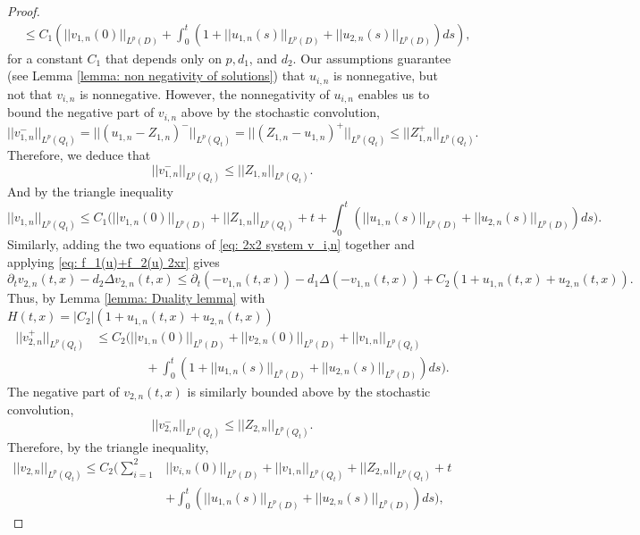 \documentclass[12pt]{article}
\theoremstyle{definition}
\theoremstyle{remark}
\begin{document}
\begin{proof}
\begin{align*}
&\leq C_1\left(||v_{1,n}(0)||_{L^p(D)}+ \int_0^t (1+||u_{1,n}(s)||_{L^p(D)}+||u_{2,n}(s)||_{L^p(D)})ds\right),
\end{align*}
for a constant $C_1$ that depends only on $p,d_1$, and $d_2$. Our assumptions guarantee (see Lemma \ref{lemma: non negativity of solutions}) that $u_{i,n}$ is nonnegative, but not that $v_{i,n}$ is nonnegative. However, the nonnegativity of $u_{i,n}$ enables us to bound the negative part of $v_{i,n}$ above by the stochastic convolution,
\begin{equation}\label{eq: how to bound negative part}
||v_{1,n}^{-}||_{L^p(Q_t)} = ||(u_{1,n}-Z_{1,n})^{-
}||_{L^p(Q_t)} =||(Z_{1,n}-u_{1,n})^{+}||_{L^p(Q_t)}\leq ||Z_{1,n}^{+}||_{L^p(Q_t)}.
\end{equation}
Therefore, we deduce that
\begin{equation}\label{eq: bound negative part 2xr}
    ||v_{1,n}^{-}||_{L^p(Q_t)}\leq||Z_{1,n}||_{L^p(Q_t)}.
\end{equation}
And by the triangle inequality
\begin{equation}\label{eq: ||v_1n|| 2xr}
||v_{1,n}||_{L^p(Q_t)}\leq C_{1}\Bigg(||v_{1,n}(0)||_{L^p(D)}+||Z_{1,n}||_{L^p(Q_t)}+t+\int_0^t (||u_{1,n}(s)||_{L^p(D)}+||u_{2,n}(s)||_{L^p(D)})ds\Bigg).
\end{equation}
Similarly, adding the two equations of \eqref{eq: 2x2 system v_i,n} together and applying \eqref{eq: f_1(u)+f_2(u) 2xr} gives
\[
\partial_t v_{2,n}(t,x) - d_2\Delta v_{2,n}(t,x) \leq \partial_t (-v_{1,n}(t,x))-d_1\Delta (-v_{1,n}(t,x)) + C_2(1+u_{1,n}(t,x)+u_{2,n}(t,x)).
\]
Thus, by Lemma \ref{lemma: Duality lemma} with $H(t,x)=|C_2|(1+u_{1,n}(t,x)+u_{2,n}(t,x))$
\begin{align*}
||v_{2,n}^{+}||_{L^p(Q_t)} &\leq C_{2}\Bigg( ||v_{1,n}(0)||_{L^p(D)}+||v_{2,n}(0)||_{L^p(D)}+ ||v_{1,n}||_{L^p(Q_t)}\\
&\qquad\qquad + \int_0^t (1+||u_{1,n}(s)||_{L^p(D)}+||u_{2,n}(s)||_{L^p(D)})ds\Bigg).
\end{align*}
The negative part of $v_{2,n}(t,x)$ is similarly bounded above by the stochastic convolution,
\[
||v_{2,n}^{-}||_{L^p(Q_t)} \leq ||Z_{2,n}||_{L^p(Q_t)}.
\]
Therefore, by the triangle inequality,
\begin{equation}\label{eq: v_2,n bound}
\begin{aligned}
||v_{2,n}||_{L^p(Q_t)}\leq C_{2}\Bigg(\sum_{i=1}^2 &||v_{i,n}(0)||_{L^p(D)}+||v_{1,n}||_{L^p(Q_t)}+||Z_{2,n}||_{L^p(Q_t)}+t\\
&+\int_0^t (||u_{1,n}(s)||_{L^p(D)}+||u_{2,n}(s)||_{L^p(D)})ds\Bigg),

\end{aligned}
\end{equation}
\end{proof}
\end{document}
